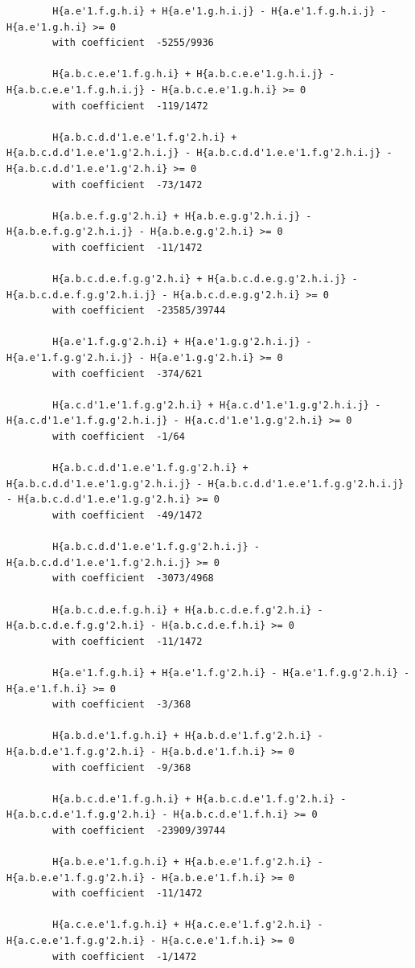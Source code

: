 \documentclass[11pt, a4paper]{kybernetika}
\begin{document}
\begin{verbatim}
		H{a.e'1.f.g.h.i} + H{a.e'1.g.h.i.j} - H{a.e'1.f.g.h.i.j} - H{a.e'1.g.h.i} >= 0
		with coefficient  -5255/9936
		
		H{a.b.c.e.e'1.f.g.h.i} + H{a.b.c.e.e'1.g.h.i.j} - H{a.b.c.e.e'1.f.g.h.i.j} - H{a.b.c.e.e'1.g.h.i} >= 0
		with coefficient  -119/1472
		
		H{a.b.c.d.d'1.e.e'1.f.g'2.h.i} + H{a.b.c.d.d'1.e.e'1.g'2.h.i.j} - H{a.b.c.d.d'1.e.e'1.f.g'2.h.i.j} - H{a.b.c.d.d'1.e.e'1.g'2.h.i} >= 0
		with coefficient  -73/1472
		
		H{a.b.e.f.g.g'2.h.i} + H{a.b.e.g.g'2.h.i.j} - H{a.b.e.f.g.g'2.h.i.j} - H{a.b.e.g.g'2.h.i} >= 0
		with coefficient  -11/1472
		
		H{a.b.c.d.e.f.g.g'2.h.i} + H{a.b.c.d.e.g.g'2.h.i.j} - H{a.b.c.d.e.f.g.g'2.h.i.j} - H{a.b.c.d.e.g.g'2.h.i} >= 0
		with coefficient  -23585/39744
		
		H{a.e'1.f.g.g'2.h.i} + H{a.e'1.g.g'2.h.i.j} - H{a.e'1.f.g.g'2.h.i.j} - H{a.e'1.g.g'2.h.i} >= 0
		with coefficient  -374/621
		
		H{a.c.d'1.e'1.f.g.g'2.h.i} + H{a.c.d'1.e'1.g.g'2.h.i.j} - H{a.c.d'1.e'1.f.g.g'2.h.i.j} - H{a.c.d'1.e'1.g.g'2.h.i} >= 0
		with coefficient  -1/64
		
		H{a.b.c.d.d'1.e.e'1.f.g.g'2.h.i} + H{a.b.c.d.d'1.e.e'1.g.g'2.h.i.j} - H{a.b.c.d.d'1.e.e'1.f.g.g'2.h.i.j} - H{a.b.c.d.d'1.e.e'1.g.g'2.h.i} >= 0
		with coefficient  -49/1472
		
		H{a.b.c.d.d'1.e.e'1.f.g.g'2.h.i.j} - H{a.b.c.d.d'1.e.e'1.f.g'2.h.i.j} >= 0
		with coefficient  -3073/4968
		
		H{a.b.c.d.e.f.g.h.i} + H{a.b.c.d.e.f.g'2.h.i} - H{a.b.c.d.e.f.g.g'2.h.i} - H{a.b.c.d.e.f.h.i} >= 0
		with coefficient  -11/1472
		
		H{a.e'1.f.g.h.i} + H{a.e'1.f.g'2.h.i} - H{a.e'1.f.g.g'2.h.i} - H{a.e'1.f.h.i} >= 0
		with coefficient  -3/368
		
		H{a.b.d.e'1.f.g.h.i} + H{a.b.d.e'1.f.g'2.h.i} - H{a.b.d.e'1.f.g.g'2.h.i} - H{a.b.d.e'1.f.h.i} >= 0
		with coefficient  -9/368
		
		H{a.b.c.d.e'1.f.g.h.i} + H{a.b.c.d.e'1.f.g'2.h.i} - H{a.b.c.d.e'1.f.g.g'2.h.i} - H{a.b.c.d.e'1.f.h.i} >= 0
		with coefficient  -23909/39744
		
		H{a.b.e.e'1.f.g.h.i} + H{a.b.e.e'1.f.g'2.h.i} - H{a.b.e.e'1.f.g.g'2.h.i} - H{a.b.e.e'1.f.h.i} >= 0
		with coefficient  -11/1472
		
		H{a.c.e.e'1.f.g.h.i} + H{a.c.e.e'1.f.g'2.h.i} - H{a.c.e.e'1.f.g.g'2.h.i} - H{a.c.e.e'1.f.h.i} >= 0
		with coefficient  -1/1472
		

\end{verbatim}
\end{document}
